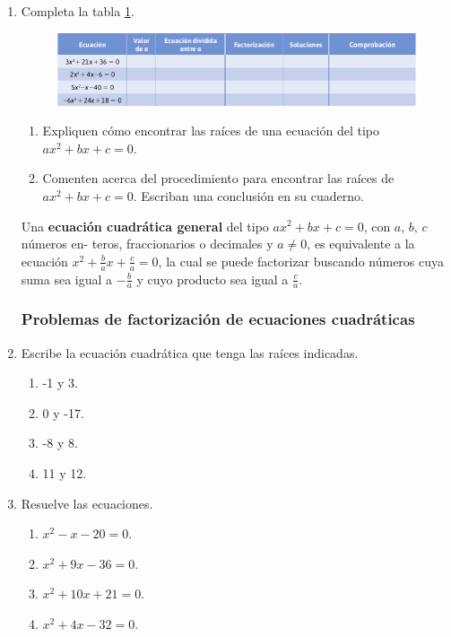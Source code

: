 \documentclass[11pt]{book}
\begin{document}
\begin{enumerate}
  \item Completa la tabla \ref{tab:table2.9}.

        \begin{figure}[H]
          \centering
          \includegraphics[width=\textwidth]{table2.9.png}
          \label{tab:table2.9}
        \end{figure}

        \begin{enumerate}
          \item Expliquen cómo encontrar las raíces de una ecuación del tipo $ax^2 + bx + c = 0$.
          \item Comenten acerca del procedimiento para encontrar las raíces de $ax^2 + bx + c = 0$. Escriban una conclusión en su cuaderno.
        \end{enumerate}

        \begin{boxH}
          Una \textbf{ecuación cuadrática general} del tipo $ax^2 + bx + c = 0$, con $a$, $b$, $c$ números en-
          teros, fraccionarios o decimales y $a \neq 0$, es equivalente a la ecuación $x^2 + \frac{b}{a} x + \frac{c}{a} = 0$,
          la cual se puede factorizar buscando números cuya suma sea igual a $-\frac{b}{a}$ y cuyo
          producto sea igual a $\frac{c}{a}$.
        \end{boxH}

        \subsubsection{Problemas de factorización de ecuaciones cuadráticas}

  \item Escribe la ecuación cuadrática que tenga las raíces indicadas.
        \begin{enumerate}
          \item -1 y 3.
          \item 0 y -17.
          \item -8 y 8.
          \item 11 y 12.
        \end{enumerate}

  \item Resuelve las ecuaciones.
        \begin{enumerate}
          \item $x^2 -  x  - 20 = 0$.
          \item $x^2 + 9x  - 36 = 0$.
          \item $x^2 + 10x + 21 = 0$.
          \item $x^2 + 4x  - 32 = 0$.
        \end{enumerate}


\end{enumerate}
\end{document}
